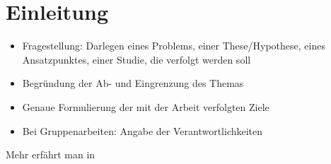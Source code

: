 \chapter{Einleitung}\label{chap:einleitung}
\begin{itemize}
\item Fragestellung: Darlegen eines Problems, einer These/Hypothese, eines Ansatzpunktes,
einer Studie, die verfolgt werden soll
\item Begründung der Ab- und Eingrenzung des
Themas
\item Genaue Formulierung der mit der Arbeit
verfolgten Ziele
\item Bei Gruppenarbeiten: Angabe der Verantwortlichkeiten
\end{itemize}

Mehr erfährt man in 
\newpage